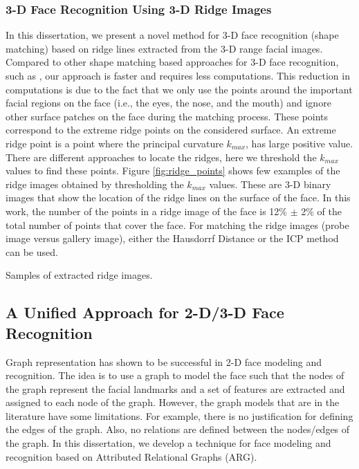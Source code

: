 \subsubsection{3-D Face Recognition Using 3-D Ridge Images}
In this dissertation, we present a novel method for 3-D face
recognition (shape matching) based on ridge lines extracted from the
3-D range facial images. Compared to other shape matching based
approaches for 3-D face recognition, such as \cite{lu06, russ05,
chang05, Maurer05}, our approach is faster and requires less
computations. This reduction in computations is due to the fact that
we only use the points around the important facial regions on the
face (i.e., the eyes, the nose, and the mouth) and ignore other
surface patches on the face during the matching process. These
points correspond to the extreme ridge points on the considered
surface. An extreme ridge point is a point where the principal
curvature $k_{max}$, has large positive value. There are different
approaches to locate the ridges, here we threshold the $k_{max}$
values to find these points. Figure \ref{fig:ridge_points} shows few
examples of the ridge images obtained by thresholding the $k_{max}$
values. These are 3-D binary images that show the location of the
ridge lines on the surface of the face. In this work, the number of
the points in a ridge image of the face is 12\% $\pm$ 2\% of the
total number of points that cover the face. For matching the ridge
images (probe image versus gallery image), either the Hausdorrf
Distance or the ICP method can be used.

\bfig {} \caption{Samples of extracted ridge images.}
\label{fig:ridge_points}\efig

\subsection{A Unified Approach for 2-D/3-D Face Recognition}
Graph representation has shown to be successful \cite{Wiskott97,
bolme_03} in 2-D face modeling and recognition. The idea is to use a
graph to model the face such that the nodes of the graph represent
the facial landmarks and a set of features are extracted and
assigned to each node of the graph. However, the graph models that
are in the literature have some limitations. For example, there is
no justification for defining the edges of the graph. Also, no
relations are defined between the nodes/edges of the graph. In this
dissertation, we develop a technique for face modeling and
recognition based on Attributed Relational Graphs (ARG).


